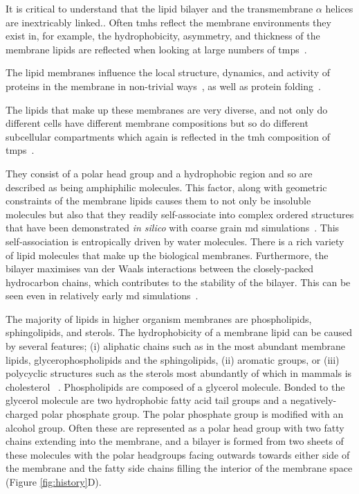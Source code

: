 It is critical to understand that the lipid bilayer and the transmembrane $\alpha$ helices are inextricably linked..
Often \gls{tmh}s reflect the membrane environments they exist in, for example, the hydrophobicity, asymmetry, and thickness of the membrane lipids are reflected when looking at large numbers of \gls{tmp}s~\cite{Sharpe2010}.

The lipid membranes influence the local structure, dynamics, and activity of proteins in the membrane in non-trivial ways~\cite{Bondar2010, Bondar2009, Jardon-Valadez2010, Kalvodova2005, Urban2005, White2001a, Jensen2004, Henin2014}, as well as protein folding~\cite{Kauko2010}.


The lipids that make up these membranes are very diverse, and not only do different cells have different membrane compositions but so do different subcellular compartments which again is reflected in the \gls{tmh} composition of \gls{tmp}s~\cite{Sharpe2010, VanMeer2008}.

They consist of a polar head group and a hydrophobic region and so are described as being amphiphilic molecules.
This factor, along with geometric constraints of the membrane lipids causes them to not only be insoluble molecules but also that they readily self-associate into complex ordered structures that have been demonstrated \textit{in silico} with coarse grain \gls{md} simulations~\cite{Scott2008}.
This self\--association is entropically driven by water molecules.
There is a rich variety of lipid molecules that make up the biological membranes.
Furthermore, the bilayer maximises van der Waals interactions between the closely-packed hydrocarbon chains, which contributes to the stability of the bilayer.
This can be seen even in relatively early \gls{md} simulations~\cite{Goetz1998}.

The majority of lipids in higher organism membranes are phospholipids, sphingolipids, and sterols.
The hydrophobicity of a membrane lipid can be caused by several features; (i) aliphatic chains such as in the most abundant membrane lipids, glycerophospholipids and the sphingolipids, (ii) aromatic groups, or (iii) polycyclic structures such as the sterols most abundantly of which in mammals is cholesterol ~\cite{Helenius1975, Lichtenberg1983}.
Phospholipids are composed of a glycerol molecule.
Bonded to the glycerol molecule are two hydrophobic fatty acid tail groups and a negatively-charged polar phosphate group.
The polar phosphate group is modified with an alcohol group.
Often these are represented as a polar head group with two fatty chains extending into the membrane, and a bilayer is formed from two sheets of these molecules with the polar headgroups facing outwards towards either side of the membrane and the fatty side chains filling the interior of the membrane space (Figure \ref{fig:history}D).

